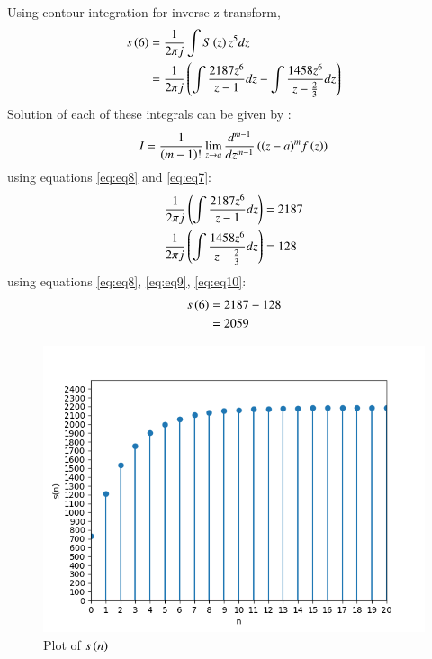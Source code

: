 \documentclass[journal,12pt,twocolumn]{IEEEtran}
\theoremstyle{remark}
\begin{document}
Using contour integration for inverse z transform,
\begin{align}
    s\left(6\right) &= \frac{1}{2\pi j}\int S\left(z\right) z^{5} dz\\
    &= \frac{1}{2\pi j}\left(\int\frac{2187z^{6}}{z-1}dz - \int\frac{1458z^{6}}{z - \frac{2}{3}} dz\right) \label{eq:eq8}
\end{align}
Solution of each of these integrals can be given by :
\begin{align}
    I =\frac{1}{\left(m-1\right)!}\lim\limits_{z\to a}\frac{d^{m-1}}{dz^{m-1}}\left({(z-a)}^{m}f\left(z\right)\right) \label{eq:eq7}
\end{align}
using equations \eqref{eq:eq8} and \eqref{eq:eq7}:
\begin{align}
    \frac{1}{2\pi j}\left(\int\frac{2187z^{6}}{z - 1}dz\right) &= 2187\label{eq:eq9}\\
     \frac{1}{2\pi j}\left(\int\frac{1458z^{6}}{z - \frac{2}{3}}dz\right)  &= 128\label{eq:eq10}
     \end{align}
using equations \eqref{eq:eq8}, \eqref{eq:eq9}, \eqref{eq:eq10}:
\begin{align}
s\left(6\right) &= 2187 - 128\\
&= 2059
\end{align}
\begin{figure}[!ht]
\centering
\begin{center}
\includegraphics[width=\columnwidth]{Figure_1}
\caption{Plot of $s\left(n\right)$}
\end{center}
\end{figure}
\end{document}
